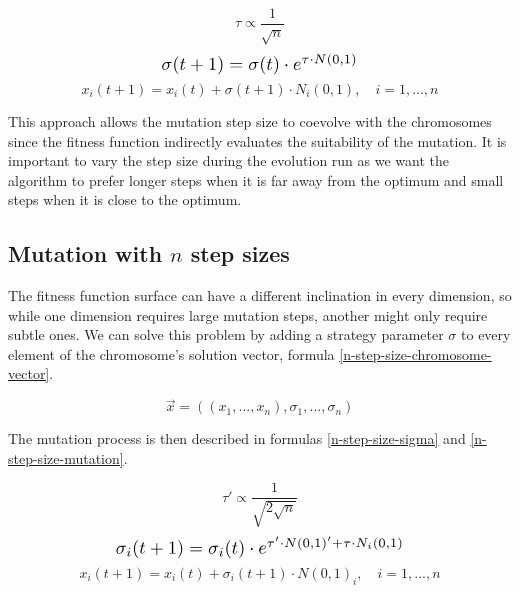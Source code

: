 \begin{equation}
    \tau \propto \frac{1}{\sqrt{n}}
\end{equation}
\begin{equation} \label{single-step-size-sigma} \scalebox{1.3}{
    $\sigma(t+1) = \sigma(t) \cdot e^{\tau \cdot N(0,1)}$
}
\end{equation}
\begin{equation} \label{single-step-size-mutation}
    x_i(t+1) = x_i(t) + \sigma(t+1) \cdot N_i(0,1), \quad i = 1,...,n
\end{equation}

This approach allows the mutation step size to coevolve with the chromosomes since the fitness function indirectly evaluates the suitability of the mutation. It is important to vary the step size during the evolution run as we want the algorithm to prefer longer steps when it is far away from the optimum and small steps when it is close to the optimum.

\subsection{Mutation with $n$ step sizes} \label{n-step}
The fitness function surface can have a different inclination in every dimension, so while one dimension requires large mutation steps, another might only require subtle ones. We can solve this problem by adding a strategy parameter $\sigma$ to every element of the chromosome's solution vector, formula \ref{n-step-size-chromosome-vector}.

 \begin{equation} \label{n-step-size-chromosome-vector}
    \vec{x} = ((x_1,...,x_n), \sigma_1,...,\sigma_n)
 \end{equation}

The mutation process is then described in formulas \ref{n-step-size-sigma} and \ref{n-step-size-mutation}.

\begin{equation}
\label{tau-prime}
\tau' \propto \frac{1}{\sqrt{2\sqrt{n}}}
\end{equation}
\begin{equation} \label{n-step-size-sigma} \scalebox{1.3}{
    $\sigma_i(t+1) = \sigma_i(t) \cdot e^{\tau' \cdot N(0,1)' + \tau \cdot N_i(0,1)}$
}
\end{equation}
\begin{equation} \label{n-step-size-mutation}
    x_i(t+1) = x_i(t) + \sigma_i(t+1) \cdot N(0,1)_i, \quad i = 1,...,n
\end{equation}

